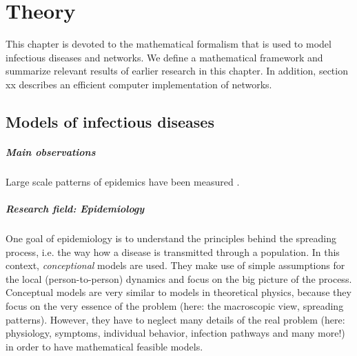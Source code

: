 %
%
%
%
%
%
%
%


\chapter{Theory}\label{sec:theory}
This chapter is devoted to the mathematical formalism that is used to model infectious diseases and networks.
We define a mathematical framework and summarize relevant results of earlier research in this chapter.
In addition, section xx describes an efficient computer implementation of networks.

\section{Models of infectious diseases}
\paragraph{Main observations\color{Cayenne}{.}} Large scale patterns of epidemics have been measured \citep{giehl:2012}.

\paragraph{Research field: Epidemiology\color{Cayenne}{.}} One goal of epidemiology is to understand the principles behind the spreading process, i.e. the way how a disease is transmitted through a population.
In this context, \emph{conceptional} models are used.
They make use of simple assumptions for the local (person-to-person) dynamics and focus on the big picture of the process.
Conceptual models are very similar to models in theoretical physics, because they focus on the very essence of the problem (here: the macroscopic view, spreading patterns).
However, they have to neglect many details of the real problem (here: physiology, symptoms, individual behavior, infection pathways and many more!) in order to have mathematical feasible models.

